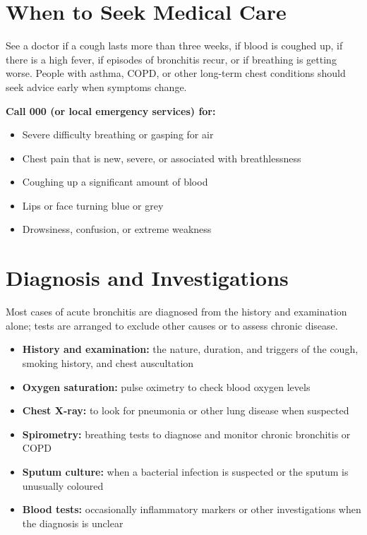 \section*{When to Seek Medical Care}
See a doctor if a cough lasts more than three weeks, if blood is coughed up, if there is a high fever, if episodes of bronchitis recur, or if breathing is getting worse. People with asthma, COPD, or other long-term chest conditions should seek advice early when symptoms change.

\textbf{Call 000 (or local emergency services) for:}
\begin{itemize}
    \item Severe difficulty breathing or gasping for air
    \item Chest pain that is new, severe, or associated with breathlessness
    \item Coughing up a significant amount of blood
    \item Lips or face turning blue or grey
    \item Drowsiness, confusion, or extreme weakness
\end{itemize}

\section*{Diagnosis and Investigations}
Most cases of acute bronchitis are diagnosed from the history and examination alone; tests are arranged to exclude other causes or to assess chronic disease.

\begin{itemize}
    \item \textbf{History and examination:} the nature, duration, and triggers of the cough, smoking history, and chest auscultation
    \item \textbf{Oxygen saturation:} pulse oximetry to check blood oxygen levels
    \item \textbf{Chest X-ray:} to look for pneumonia or other lung disease when suspected
    \item \textbf{Spirometry:} breathing tests to diagnose and monitor chronic bronchitis or COPD
    \item \textbf{Sputum culture:} when a bacterial infection is suspected or the sputum is unusually coloured
    \item \textbf{Blood tests:} occasionally inflammatory markers or other investigations when the diagnosis is unclear
\end{itemize}

